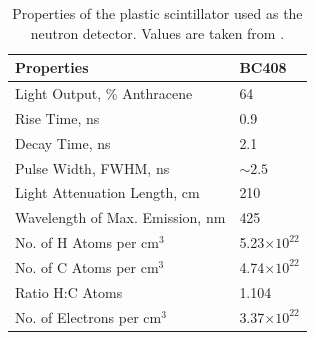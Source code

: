 \begin{table}[htp]
\centering
\begin{tabular}{ll}
Properties & BC408 \\
\hline
Light Output, \% Anthracene & 64 \\
Rise Time, ns & 0.9 \\
Decay Time, ns & 2.1 \\
Pulse Width, FWHM, ns & $\sim2.5$ \\
Light Attenuation Length, cm & 210 \\
Wavelength of Max. Emission, nm & 425 \\
No. of H Atoms per cm$^3$ & 5.23$\times10^{22}$ \\
No. of C Atoms per cm$^3$ & 4.74$\times10^{22}$ \\
Ratio H:C Atoms & 1.104 \\
No. of Electrons per cm$^3$ & 3.37$\times10^{22}$ \\
\end{tabular}
\caption{Properties of the plastic scintillator used as the neutron detector. Values are taken from \cite{BC408}.}
\label{tab:BC408}
\end{table}

